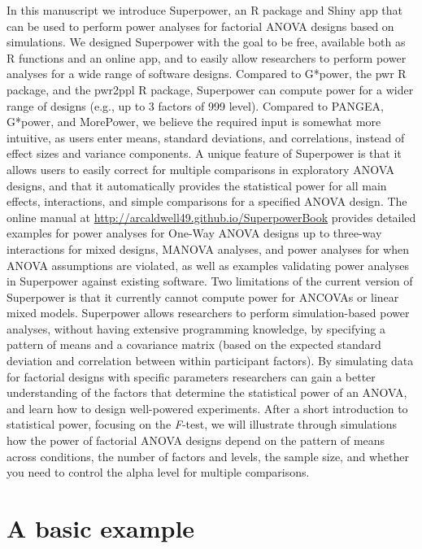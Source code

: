 \documentclass[
  ,jou,floatsintext]{apa6}
\begin{document}
In this manuscript we introduce Superpower, an R package and Shiny app that can be used to perform power analyses for factorial ANOVA designs based on simulations.
We designed Superpower with the goal to be free, available both as R functions and an online app, and to easily allow researchers to perform power analyses for a wide range of software designs.
Compared to G*power, the pwr R package, and the pwr2ppl R package, Superpower can compute power for a wider range of designs (e.g., up to 3 factors of 999 level).
Compared to PANGEA, G*power, and MorePower, we believe the required input is somewhat more intuitive, as users enter means, standard deviations, and correlations, instead of effect sizes and variance components.
A unique feature of Superpower is that it allows users to easily correct for multiple comparisons in exploratory ANOVA designs, and that it automatically provides the statistical power for all main effects, interactions, and simple comparisons for a specified ANOVA design.
The online manual at \url{http://arcaldwell49.github.io/SuperpowerBook} provides detailed examples for power analyses for One-Way ANOVA designs up to three-way interactions for mixed designs, MANOVA analyses, and power analyses for when ANOVA assumptions are violated, as well as examples validating power analyses in Superpower against existing software.
Two limitations of the current version of Superpower is that it currently cannot compute power for ANCOVAs or linear mixed models.
Superpower allows researchers to perform simulation-based power analyses, without having extensive programming knowledge, by specifying a pattern of means and a covariance matrix (based on the expected standard deviation and correlation between within participant factors).
By simulating data for factorial designs with specific parameters researchers can gain a better understanding of the factors that determine the statistical power of an ANOVA, and learn how to design well-powered experiments.
After a short introduction to statistical power, focusing on the \emph{F}-test, we will illustrate through simulations how the power of factorial ANOVA designs depend on the pattern of means across conditions, the number of factors and levels, the sample size, and whether you need to control the alpha level for multiple comparisons.

\hypertarget{a-basic-example}{%
\section{A basic example}\label{a-basic-example}}
\end{document}
